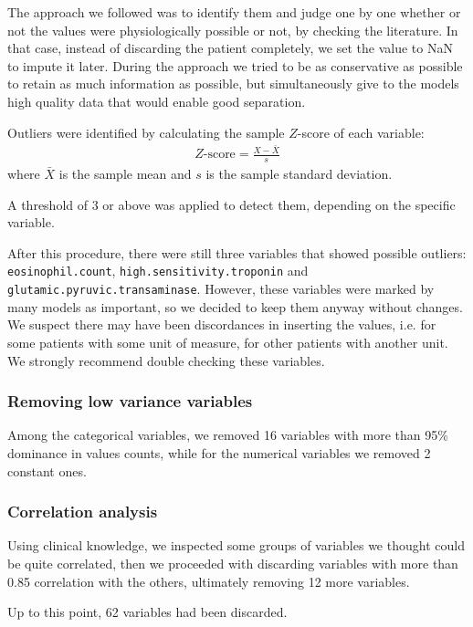 The approach we followed was to identify them and judge one by one whether or not the values were physiologically possible or not, by checking the literature. In that case, instead of discarding the patient completely, we set the value to NaN to impute it later. During the approach we tried to be as conservative as possible to retain as much information as possible, but simultaneously give to the models high quality data that would enable good separation.

Outliers were identified by calculating the sample $Z$-score of each variable:
\begin{align*}
    Z\text{-score} = \frac{X-\bar{X}}{s}
\end{align*}
where $\bar{X}$ is the sample mean and $s$ is the sample standard deviation.

A threshold of 3 or above was applied to detect them, depending on the specific variable.

After this procedure, there were still three variables that showed possible outliers: \texttt{eosinophil.count}, \texttt{high.sensitivity.troponin} and \texttt{glutamic.pyruvic.transaminase}. However, these variables were marked by many models as important, so we decided to keep them anyway without changes. We suspect there may have been discordances in inserting the values, i.e. for some patients with some unit of measure, for other patients with another unit. We strongly recommend double checking these variables.

\subsubsection{Removing low variance variables}

Among the categorical variables, we removed 16 variables with more than 95\% dominance in values counts, while for the numerical variables we removed 2 constant ones.

\subsubsection{Correlation analysis}

Using clinical knowledge, we inspected some groups of variables we thought could be quite correlated, then we proceeded with discarding variables with more than 0.85 correlation with the others, ultimately removing 12 more variables.

Up to this point, 62 variables had been discarded.

